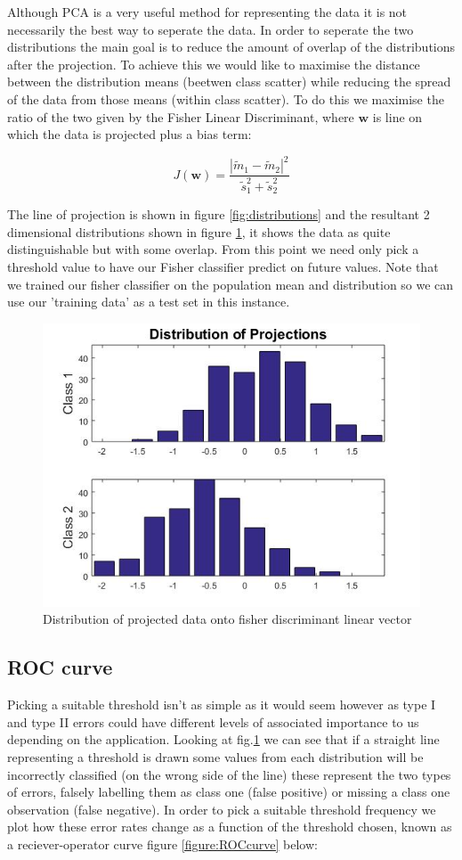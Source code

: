 \documentclass[a4paper,11pt, twocolumn]{article}
\begin{document}
Although PCA is a very useful method for representing the data it is not necessarily the best way to seperate the data. In order to seperate the two distributions the main goal is to reduce the amount of overlap of the distributions after the projection. To achieve this we would like to maximise the distance between the distribution means (beetwen class scatter) while reducing the spread of the data from those means (within class scatter). To do this we maximise the ratio of the two given by the Fisher Linear Discriminant, where $\mathbf{w}$ is line on which the data is projected plus a bias term:

\begin{equation}
	J(\mathbf{w}) = \frac{|\tilde{m}_1 - \tilde{m}_2|^2}{\tilde{s}_1^2 + \tilde{s}_2^2}
\end{equation}

The line of projection is shown in figure \ref{fig:distributions} and the resultant 2 dimensional distributions shown in figure \ref{figure:projectedData}, it shows the data as quite distinguishable but with some overlap. From this point we need only pick a threshold value to have our Fisher classifier predict on future values. Note that we trained our fisher classifier on the population mean and distribution so we can use our 'training data' as a test set in this instance. 

\begin{figure}[ht]
	\includegraphics[width=0.7\linewidth]{ProjectionsDistribution.jpg}
	\centering
	\caption{Distribution of projected data onto fisher discriminant linear vector}
    \label{figure:projectedData}
\end{figure}

\subsection{ROC curve}
Picking a suitable threshold isn't as simple as it would seem however as type I and type II errors could have different levels of associated importance to us depending on the application. Looking at fig.\ref{figure:projectedData} we can see that if a straight line representing a threshold is drawn some values from each distribution will be incorrectly classified (on the wrong side of the line) these represent the two types of errors, falsely labelling them as class one (false positive) or missing a class one observation (false negative). In order to pick a suitable threshold frequency we plot how these error rates change as a function of the threshold chosen, known as a reciever-operator curve figure \ref{figure:ROCcurve} below:
\end{document}
